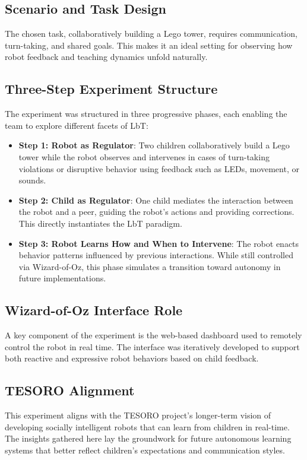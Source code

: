 \documentclass[a4paper]{usiinfbachelorproject}
\begin{document}
\subsection*{\textbf{Scenario and Task Design}}
The chosen task, collaboratively building a Lego tower, requires communication, turn-taking, and shared goals.
This makes it an ideal setting for observing how robot feedback and teaching dynamics unfold naturally.

\subsection*{\textbf{Three-Step Experiment Structure}}
The experiment was structured in three progressive phases, each enabling the team to explore different facets of LbT:

\begin{itemize}
    \item \textbf{Step 1: Robot as Regulator}: Two children collaboratively build a Lego tower while the robot observes and intervenes in cases of turn-taking violations or disruptive behavior using feedback such as LEDs, movement, or sounds.
    \item \textbf{Step 2: Child as Regulator}: One child mediates the interaction between the robot and a peer, guiding the robot's actions and providing corrections. This directly instantiates the LbT paradigm.
    \item \textbf{Step 3: Robot Learns How and When to Intervene}: The robot enacts behavior patterns influenced by previous interactions. While still controlled via Wizard-of-Oz, this phase simulates a transition toward autonomy in future implementations.
\end{itemize}

\subsection*{\textbf{Wizard-of-Oz Interface Role}}
A key component of the experiment is the web-based dashboard used to remotely control the robot in real time.
The interface was iteratively developed to support both reactive and expressive robot behaviors based on child feedback.

\subsection*{\textbf{TESORO Alignment}}
This experiment aligns with the TESORO project's longer-term vision of developing socially intelligent robots that can learn from children in real-time.
The insights gathered here lay the groundwork for future autonomous learning systems that better reflect children's expectations and communication styles.
\end{document}
